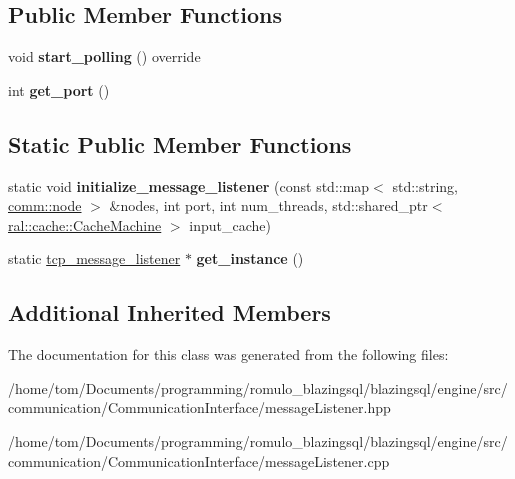 \subsection*{Public Member Functions}
\begin{DoxyCompactItemize}
\item 
\mbox{\label{classcomm_1_1tcp__message__listener_a09c9209787edf88d56958759d41bd024}} 
void {\bfseries start\+\_\+polling} () override
\item 
\mbox{\label{classcomm_1_1tcp__message__listener_aa3b46d15b04020856ad8c5e3cf5634b3}} 
int {\bfseries get\+\_\+port} ()
\end{DoxyCompactItemize}
\subsection*{Static Public Member Functions}
\begin{DoxyCompactItemize}
\item 
\mbox{\label{classcomm_1_1tcp__message__listener_a8381140931cdeef27cfcab33634d6048}} 
static void {\bfseries initialize\+\_\+message\+\_\+listener} (const std\+::map$<$ std\+::string, \hyperlink{classcomm_1_1node}{comm\+::node} $>$ \&nodes, int port, int num\+\_\+threads, std\+::shared\+\_\+ptr$<$ \hyperlink{classral_1_1cache_1_1CacheMachine}{ral\+::cache\+::\+Cache\+Machine} $>$ input\+\_\+cache)
\item 
\mbox{\label{classcomm_1_1tcp__message__listener_a4815f479af1dffacb72d59e656913306}} 
static \hyperlink{classcomm_1_1tcp__message__listener}{tcp\+\_\+message\+\_\+listener} $\ast$ {\bfseries get\+\_\+instance} ()
\end{DoxyCompactItemize}
\subsection*{Additional Inherited Members}


The documentation for this class was generated from the following files\+:\begin{DoxyCompactItemize}
\item 
/home/tom/\+Documents/programming/romulo\+\_\+blazingsql/blazingsql/engine/src/communication/\+Communication\+Interface/message\+Listener.\+hpp\item 
/home/tom/\+Documents/programming/romulo\+\_\+blazingsql/blazingsql/engine/src/communication/\+Communication\+Interface/message\+Listener.\+cpp\end{DoxyCompactItemize}
